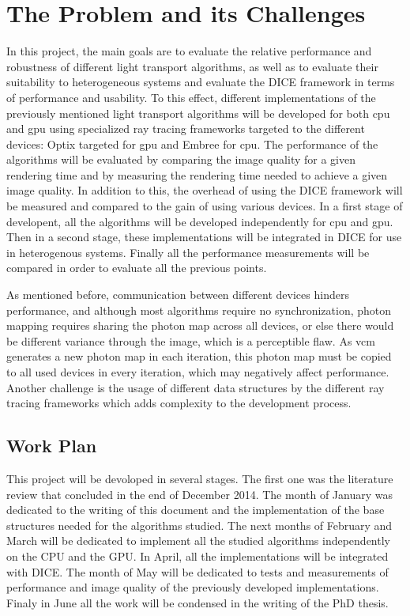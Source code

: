 \chapter{The Problem and its Challenges}

In this project, the main goals are to evaluate the relative performance and robustness of different light transport algorithms, as well as to evaluate their suitability to heterogeneous systems and evaluate the DICE framework in terms of performance and usability. To this effect, different implementations of the previously mentioned light transport algorithms will be developed for both \gls{cpu} and \gls{gpu} using specialized ray tracing frameworks targeted to the different devices: Optix targeted for \gls{gpu} and Embree for \gls{cpu}. The performance of the algorithms will be evaluated by comparing the image quality for a given rendering time and by measuring the rendering time needed to achieve a given image quality. In addition to this, the overhead of using the DICE framework will be measured and compared to the gain of using various devices. In a first stage of developent, all the algorithms will be developed independently for \gls{cpu} and \gls{gpu}. Then in a second stage, these implementations will be integrated in DICE for use in heterogenous systems. Finally all the performance measurements will be compared in order to evaluate all the previous points.

As mentioned before, communication between different devices hinders performance, and although most algorithms require no synchronization, photon mapping requires sharing the photon map across all devices, or else there would be different variance through the image, which is a perceptible flaw. As \gls{vcm} generates a new photon map in each iteration, this photon map must be copied to all used devices in every iteration, which may negatively affect performance. Another challenge is the usage of different data structures by the different ray tracing frameworks which adds complexity to the development process.

\section{Work Plan}

This project will be devoloped in several stages. The first one was the literature review that concluded in the end of December 2014. The month of January was dedicated to the writing of this document and the implementation of the base structures needed for the algorithms studied. The next months of February and March will be dedicated to implement all the studied algorithms independently on the CPU and the GPU. In April, all the implementations will be integrated with DICE. The month of May will be dedicated to tests and measurements of performance and image quality of the previously developed implementations. Finaly in June all the work will be condensed in the writing of the PhD thesis.
